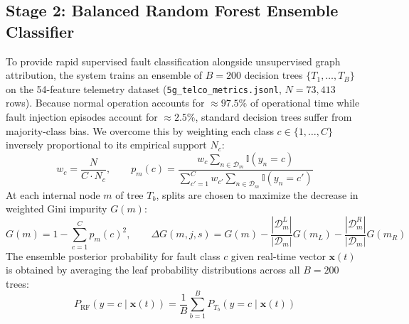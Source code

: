 \subsection{Stage 2: Balanced Random Forest Ensemble Classifier}
To provide rapid supervised fault classification alongside unsupervised graph attribution, the system trains an ensemble of $B = 200$ decision trees $\{T_1, \dots, T_B\}$ on the 54-feature telemetry dataset (\texttt{5g\_telco\_metrics.jsonl}, $N = 73,413$ rows). Because normal operation accounts for $\approx 97.5\%$ of operational time while fault injection episodes account for $\approx 2.5\%$, standard decision trees suffer from majority-class bias. We overcome this by weighting each class $c \in \{1, \dots, C\}$ inversely proportional to its empirical support $N_c$:
\begin{equation}
w_c = \frac{N}{C \cdot N_c}, \qquad p_m(c) = \frac{w_c \sum_{n \in \mathcal{D}_m} \mathbb{I}(y_n = c)}{\sum_{c'=1}^{C} w_{c'} \sum_{n \in \mathcal{D}_m} \mathbb{I}(y_n = c')}
\label{eq:rf_weight}
\end{equation}
At each internal node $m$ of tree $T_b$, splits are chosen to maximize the decrease in weighted Gini impurity $G(m)$:
\begin{equation}
G(m) = 1 - \sum_{c=1}^{C} p_m(c)^2, \qquad \Delta G(m, j, s) = G(m) - \frac{|\mathcal{D}_m^L|}{|\mathcal{D}_m|} G(m_L) - \frac{|\mathcal{D}_m^R|}{|\mathcal{D}_m|} G(m_R)
\label{eq:rf_gini}
\end{equation}
The ensemble posterior probability for fault class $c$ given real-time vector $\mathbf{x}(t)$ is obtained by averaging the leaf probability distributions across all $B = 200$ trees:
\begin{equation}
P_{\text{RF}}(y = c \mid \mathbf{x}(t)) = \frac{1}{B} \sum_{b=1}^{B} P_{T_b}(y = c \mid \mathbf{x}(t))
\label{eq:rf_prob}
\end{equation}

